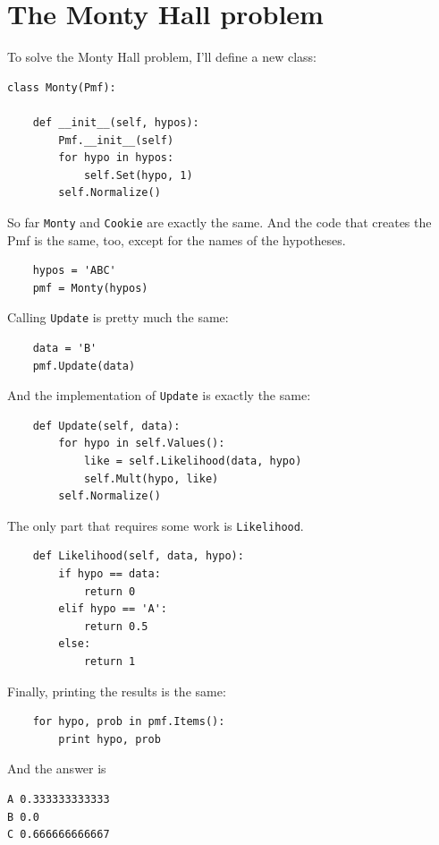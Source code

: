 \documentclass[12pt]{book}
\begin{document}
\section{The Monty Hall problem}

To solve the Monty Hall problem, I'll define a new class:

\begin{verbatim}
class Monty(Pmf):

    def __init__(self, hypos):
        Pmf.__init__(self)
        for hypo in hypos:
            self.Set(hypo, 1)
        self.Normalize()
\end{verbatim}

So far \verb"Monty" and \verb"Cookie" are exactly the same.
And the code that creates the Pmf is the same, too, except for
the names of the hypotheses.

\begin{verbatim}
    hypos = 'ABC'
    pmf = Monty(hypos)
\end{verbatim}

Calling \verb"Update" is pretty much the same:

\begin{verbatim}
    data = 'B'
    pmf.Update(data)
\end{verbatim}

And the implementation of \verb"Update" is exactly the same:

\begin{verbatim}
    def Update(self, data):
        for hypo in self.Values():
            like = self.Likelihood(data, hypo)
            self.Mult(hypo, like)
        self.Normalize()
\end{verbatim}

The only part that requires some work is \verb"Likelihood".

\begin{verbatim}
    def Likelihood(self, data, hypo):
        if hypo == data:
            return 0
        elif hypo == 'A':
            return 0.5
        else:
            return 1
\end{verbatim}

Finally, printing the results is the same:

\begin{verbatim}
    for hypo, prob in pmf.Items():
        print hypo, prob
\end{verbatim}

And the answer is

\begin{verbatim}
A 0.333333333333
B 0.0
C 0.666666666667
\end{verbatim}
\end{document}
